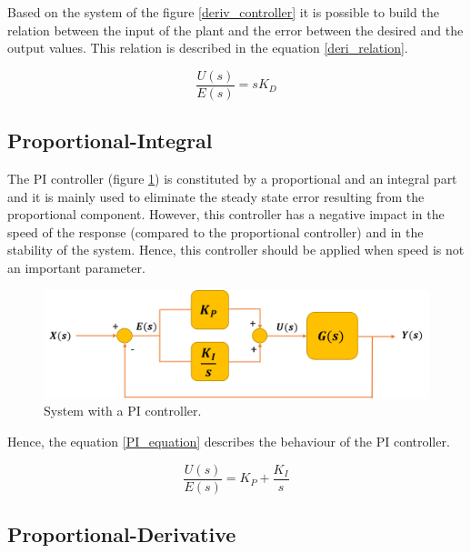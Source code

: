 Based on the system of the figure \ref{deriv_controller} it is possible to build the relation between the input of the plant and the error between the desired and the output values. This relation is described in the equation \ref{deri_relation}.

\begin{equation}\label{deri_relation}
\frac{U(s)}{E(s)}= sK_D
\end{equation}

\subsection*{Proportional-Integral}

The PI controller (figure \ref{PI_controller}) is constituted by a proportional and an integral part and it is mainly used to eliminate the steady state error resulting from the proportional component. However, this controller has a negative impact in the speed of the response (compared to the proportional controller) and in the stability of the system. Hence, this controller should be applied when speed is not an important parameter. %

\begin{figure}[H]
	\centering
	\includegraphics[scale=0.6]{figures/PI_controller.png}
	\caption{System with a PI controller.}
	\label{PI_controller}
\end{figure}

Hence, the equation \ref{PI_equation} describes the behaviour of the PI controller.

\begin{equation}\label{PI_equation}
\frac{U(s)}{E(s)}= K_P + \frac{K_I}{s}
\end{equation}

\subsection*{Proportional-Derivative}

